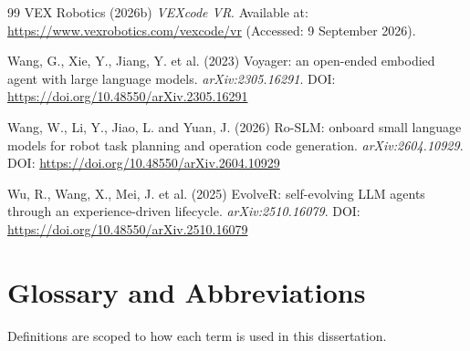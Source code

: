 \documentclass[11pt,a4paper]{report}
\begin{document}
\begin{thebibliography}{99}
 VEX Robotics (2026b) \textit{VEXcode VR}. Available at: \url{https://www.vexrobotics.com/vexcode/vr} (Accessed: 9 September 2026).

 Wang, G., Xie, Y., Jiang, Y. et al. (2023) Voyager: an open-ended embodied agent with large language models. \textit{arXiv:2305.16291}. DOI: \url{https://doi.org/10.48550/arXiv.2305.16291}

 Wang, W., Li, Y., Jiao, L. and Yuan, J. (2026) Ro-SLM: onboard small language models for robot task planning and operation code generation. \textit{arXiv:2604.10929}. DOI: \url{https://doi.org/10.48550/arXiv.2604.10929}

 Wu, R., Wang, X., Mei, J. et al. (2025) EvolveR: self-evolving LLM agents through an experience-driven lifecycle. \textit{arXiv:2510.16079}. DOI: \url{https://doi.org/10.48550/arXiv.2510.16079}

\end{thebibliography}

\appendix
\renewcommand{\thechapter}{\Alph{chapter}}

\chapter{Glossary and Abbreviations}
Definitions are scoped to how each term is used in this dissertation.
\end{document}
